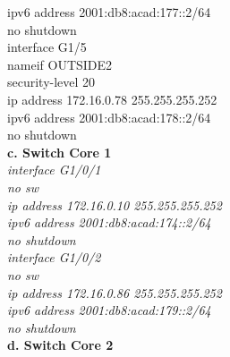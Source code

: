 \documentclass[12pt,a4paper]{report}
\begin{document}
{\hspace*{2cm}ipv6 address 2001:db8:acad:177::2/64\\
\hspace*{2cm}no shutdown\\
\hspace*{2cm}interface G1/5\\
\hspace*{2cm}nameif OUTSIDE2\\
\hspace*{2cm}security-level 20\\
\hspace*{2cm}ip address 172.16.0.78 255.255.255.252\\
\hspace*{2cm}ipv6 address 2001:db8:acad:178::2/64\\
\hspace*{2cm}no shutdown\\}
\hspace*{1cm}\textbf{c. Switch Core 1}\\
\hspace*{2cm}\textit{interface G1/0/1\\
\hspace*{2cm}no sw\\
\hspace*{2cm}ip address 172.16.0.10 255.255.255.252\\
\hspace*{2cm}ipv6 address 2001:db8:acad:174::2/64\\
\hspace*{2cm}no shutdown\\
\hspace*{2cm}interface G1/0/2\\
\hspace*{2cm}no sw\\
\hspace*{2cm}ip address 172.16.0.86 255.255.255.252\\
\hspace*{2cm}ipv6 address 2001:db8:acad:179::2/64\\
\hspace*{2cm}no shutdown\\}
\hspace*{1cm}\textbf{d. Switch Core 2}\\
\end{document}
